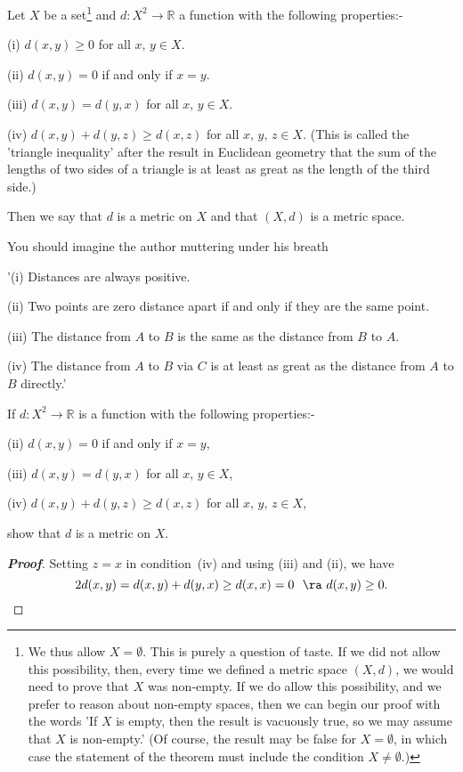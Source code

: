 \begin{definition}\label{D;metric} Let $X$ be a 
set\footnote{We thus allow $X=\emptyset$. 
This is purely a question of taste. If we did not
allow this possibility, then, every time we
defined a metric
space $(X,d)$, we would need to prove that $X$ was non-empty.
If we do allow this possibility, and we prefer
to reason about non-empty spaces, then we can begin our proof
with the words 'If $X$ is empty, then the result is
vacuously true, so we may assume that $X$ is non-empty.'
(Of course, the result may be false for $X=\emptyset$,
in which case the statement of the theorem must include
the condition $X\neq\emptyset$.)} and
$d:X^{2}\rightarrow{\mathbb R}$ a function with the
following properties:-

(i) $d(x,y)\geq 0$ for all $x,\,y\in X$.

(ii) $d(x,y)=0$ if and only if $x=y$.

(iii) $d(x,y)=d(y,x)$ for all $x,\,y\in X$.

(iv) $d(x,y)+d(y,z)\geq d(x,z)$ for all $x,\,y,\,z\in X$.
(This is called the 'triangle inequality' after the
result in Euclidean geometry that the sum of the lengths
of two sides of a triangle is at least as great as the
length of the third side.)

Then we say that $d$ is a metric on $X$ and that $(X,d)$
is a metric space.
\end{definition}
You should imagine the author muttering under his breath

'(i) Distances are always positive.

(ii) Two points are zero distance apart if and only
if they are the same point.

(iii) The distance from $A$ to $B$ is the same
as the distance from $B$ to $A$.

(iv) The distance from $A$ to $B$ via $C$
is at least as great as the distance from $A$ to $B$
directly.'

\begin{theorem}
If $d:X^{2}\rightarrow{\mathbb R}$ is a function with the
following properties:-
                                                                               
(ii) $d(x,y)=0$ if and only if $x=y$,
                                                                               
(iii) $d(x,y)=d(y,x)$ for all $x,\,y\in X$,
                                                                               
(iv) $d(x,y)+d(y,z)\geq d(x,z)$ for all $x,\,y,\,z\in X$,
                                                                               
\noindent show that $d$ is a metric on $X$. 
\end{theorem}
\begin{proof}[\bf Proof] Setting $z=x$ in condition~(iv) and using
(iii) and (ii), we have
\[2d(x,y)=d(x,y)+d(y,x)\geq d(x,x)=0 \ \ \ra \ d(x,y)\geq 0 .\]
\end{proof}

